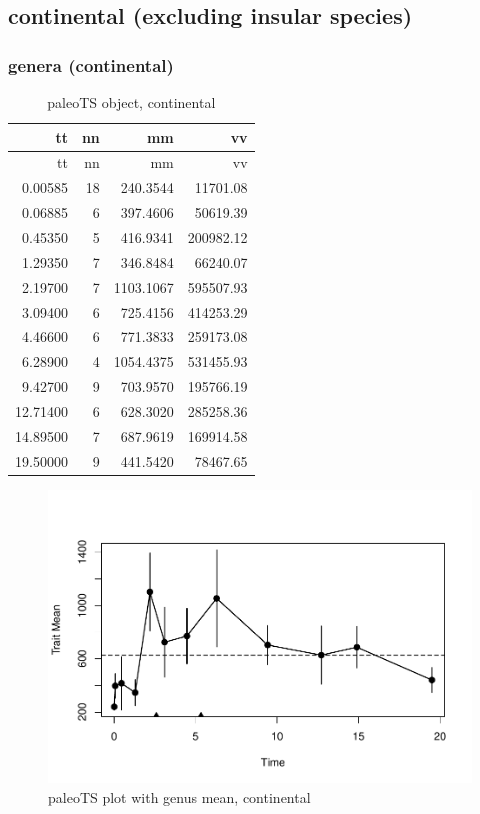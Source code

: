 \documentclass[]{article}
\begin{document}
\newpage

\subsection{continental (excluding insular
species)}\label{continental-excluding-insular-species}

\subsubsection{genera (continental)}\label{genera-continental}

\begin{longtable}[]{@{}rrrr@{}}
\caption{paleoTS object, continental}\tabularnewline
\toprule
tt & nn & mm & vv\tabularnewline
\midrule
\endfirsthead
\toprule
tt & nn & mm & vv\tabularnewline
\midrule
\endhead
0.00585 & 18 & 240.3544 & 11701.08\tabularnewline
0.06885 & 6 & 397.4606 & 50619.39\tabularnewline
0.45350 & 5 & 416.9341 & 200982.12\tabularnewline
1.29350 & 7 & 346.8484 & 66240.07\tabularnewline
2.19700 & 7 & 1103.1067 & 595507.93\tabularnewline
3.09400 & 6 & 725.4156 & 414253.29\tabularnewline
4.46600 & 6 & 771.3833 & 259173.08\tabularnewline
6.28900 & 4 & 1054.4375 & 531455.93\tabularnewline
9.42700 & 9 & 703.9570 & 195766.19\tabularnewline
12.71400 & 6 & 628.3020 & 285258.36\tabularnewline
14.89500 & 7 & 687.9619 & 169914.58\tabularnewline
19.50000 & 9 & 441.5420 & 78467.65\tabularnewline
\bottomrule
\end{longtable}

\begin{figure}[htbp]
\centering
\includegraphics{MA_JJ_files/figure-latex/paleoTSC-1.pdf}
\caption{paleoTS plot with genus mean, continental}
\end{figure}
\end{document}
